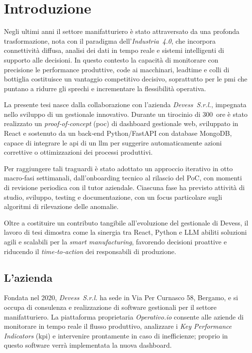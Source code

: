 \chapter{Introduzione}
\label{chap:introduzione}

Negli ultimi anni il settore manifatturiero è stato attraversato da una profonda trasformazione, nota con il paradigma dell’\textit{Industria~4.0}, che 
incorpora connettività diffusa, analisi dei dati in tempo reale e sistemi intelligenti di supporto alle decisioni. In questo contesto la capacità di monitorare con 
precisione le performance produttive, code ai macchinari, \gls{leadtime} e colli di bottiglia costituisce un vantaggio competitivo decisivo, soprattutto per le \gls{pmi} che puntano a ridurre gli sprechi e incrementare la flessibilità operativa.

La presente tesi nasce dalla collaborazione con l’azienda \textit{Devess~S.r.l.}, impegnata nello sviluppo di un gestionale innovativo. Durante un tirocinio di 300~ore è 
stato realizzato un \textit{proof‑of‑concept} (\gls{poc}) di dashboard gestionale web, sviluppato in React e sostenuto da un back‑end Python/FastAPI 
con database MongoDB, capace di integrare le \gls{api} di un \gls{llm} per suggerire automaticamente azioni correttive o ottimizzazioni dei processi produttivi.

Per raggiungere tali traguardi è stato adottato un approccio iterativo in otto macro‑fasi settimanali, dall’onboarding tecnico al rilascio del PoC, con momenti di revisione 
periodica con il tutor aziendale. Ciascuna fase ha previsto attività di studio, sviluppo, testing e documentazione, con un focus particolare sugli algoritmi di rilevazione delle anomalie.

Oltre a costituire un contributo tangibile all’evoluzione del gestionale di Devess, il lavoro di tesi dimostra come la sinergia tra React, Python e LLM abiliti soluzioni 
agili e scalabili per la \textit{smart manufacturing}, favorendo decisioni proattive e riducendo il \textit{time‑to‑action} dei responsabili di produzione.

\section{L'azienda}
Fondata nel 2020, \textit{Devess~S.r.l.} ha sede in Via Per Curnasco 58, Bergamo, e si occupa di consulenza e realizzazione di software gestionali per il settore manifatturiero. 
La piattaforma proprietaria \textit{Operativo.io} consente alle aziende di monitorare in tempo reale il flusso produttivo, analizzare i \textit{Key Performance Indicators} 
(\gls{kpi}) e intervenire prontamente in caso di inefficienze; proprio in questo software verrà implementata la nuova dashboard.

